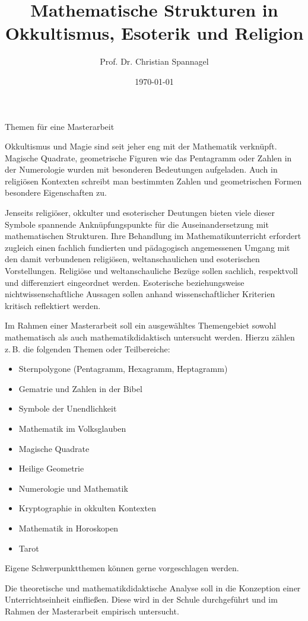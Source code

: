\documentclass{cssheet}
\title{Mathematische Strukturen in Okkultismus, Esoterik und Religion}
\author{Prof. Dr. Christian Spannagel}
\date{\today}
\begin{document}
\vspace*{5mm}
\begin{center}
{\Large Themen für eine Masterarbeit}
\end{center}

\printtitle
\vspace*{1cm}

Okkultismus und Magie sind seit jeher eng mit der Mathematik verknüpft. Magische Quadrate, geometrische Figuren wie das Pentagramm oder Zahlen in der Numerologie wurden mit besonderen Bedeutungen aufgeladen. Auch in religiösen Kontexten schreibt man bestimmten Zahlen und geometrischen Formen besondere Eigenschaften zu.

Jenseits religiöser, okkulter und esoterischer Deutungen bieten viele dieser Symbole spannende Anknüpfungspunkte für die Auseinandersetzung mit mathematischen Strukturen. Ihre Behandlung im Mathematikunterricht erfordert zugleich einen fachlich fundierten und pädagogisch angemessenen Umgang mit den damit verbundenen religiösen, weltanschaulichen und esoterischen Vorstellungen. Religiöse und weltanschauliche Bezüge sollen sachlich, respektvoll und differenziert eingeordnet werden. Esoterische beziehungsweise nichtwissenschaftliche Aussagen sollen anhand wissenschaftlicher Kriterien kritisch reflektiert werden.

Im Rahmen einer Masterarbeit soll ein ausgewähltes Themengebiet sowohl mathematisch als auch mathematikdidaktisch untersucht werden. Hierzu zählen z.\,B. die folgenden Themen oder Teilbereiche:

\begin{itemize}
\item Sternpolygone (Pentagramm, Hexagramm, Heptagramm)
\item Gematrie und Zahlen in der Bibel
\item Symbole der Unendlichkeit
\item Mathematik im Volksglauben
\item Magische Quadrate
\item Heilige Geometrie
\item Numerologie und Mathematik
\item Kryptographie in okkulten Kontexten
\item Mathematik in Horoskopen
\item Tarot
\end{itemize}

Eigene Schwerpunktthemen können gerne vorgeschlagen werden.

Die theoretische und mathematikdidaktische Analyse soll in die Konzeption einer Unterrichtseinheit einfließen. Diese wird in der Schule durchgeführt und im Rahmen der Masterarbeit empirisch untersucht.
\end{document}
